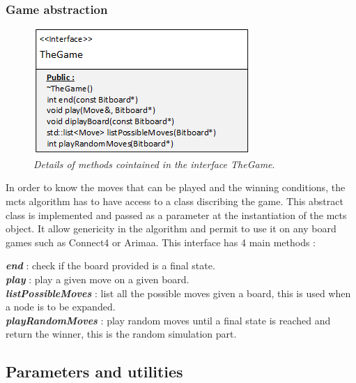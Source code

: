 \subsubsection{Game abstraction}
\begin{figure}[H] 
\centerline{\includegraphics[scale=0.8]{Data_Structure/Img/TheGame.png}}
\caption{\label{fig:thegamedetails}\textit{Details of methods cointained in the interface TheGame}.}
\end{figure}
In order to know the moves that can be played and the winning conditions, the mcts algorithm has to have access to a class discribing the game. This abstract class is implemented and passed as a parameter at the instantiation of the mcts object. It allow genericity in the algorithm and permit to use it on any board games such as Connect4 or Arimaa. This interface has 4 main methods : 

\noindent
\textit{\textbf{end}} : check if the board provided is a final state.
\medskip\\
\textit{\textbf{play}} : play a given move on a given board.
\medskip\\
\textit{\textbf{listPossibleMoves}} : list all the possible moves given a board, this is used when a node is to be expanded.
\medskip\\
\textit{\textbf{playRandomMoves}} : play random moves until a final state is reached and return the winner, this is the random simulation part.

\newpage
\subsection{Parameters and utilities}
